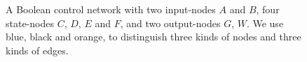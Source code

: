  
 \begin{figure}[thpb]
      \centering
      
      \caption{A Boolean control network with two input-nodes $A$ and $B$, four state-nodes $C$, $D$, $E$ and $F$, and two output-nodes $G$, $W$. We use blue, black and orange, to distinguish three kinds of nodes and three kinds of edges.}
      \label{fig:1}
  \end{figure}



